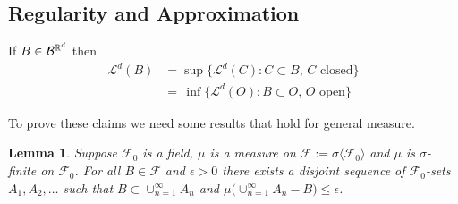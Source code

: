 \documentclass[10pt,letterpaper,twocolumn]{article}
\newtheorem{lemma}{Lemma}
\begin{document}
\subsection{Regularity and Approximation}

If $B\in\mathcal B^{\Bbb R^d}$  then
\begin{align*}
\mathcal L^d(B)  &= \sup \{ \mathcal L^d(C):  C\subset B,\, \text{$C$ closed}\}\\
  &=\, \inf \{ \mathcal L^d(O):  B\subset O,\, \text{$O$ open}\}
\end{align*}



To prove these claims we need some results that hold for general measure.


\begin{lemma}
\label{l1}
 Suppose  $\mathcal F_0$ is a field, $\mu$ is a measure on $\mathcal F:=\sigma\langle \mathcal F_0\rangle$ and $\mu$ is $\sigma$-finite on $\mathcal F_0$. For all $B\in \mathcal F$ and $\epsilon>0$ there exists a disjoint sequence of $\mathcal F_0$-sets $A_1, A_2,\ldots$ such that $B\subset \cup_{n=1}^\infty A_n$ and $ \mu\bigl( \cup_{n=1}^\infty A_n - 
 B\bigr)\leq \epsilon$.
\end{lemma}
\end{document}
